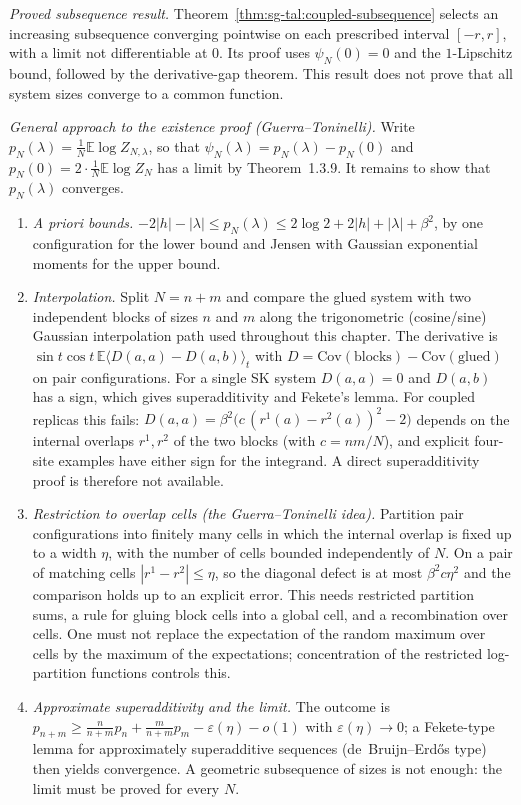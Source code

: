 \begin{remark}
\emph{Proved subsequence result.} Theorem~\ref{thm:sg-tal:coupled-subsequence} selects an increasing subsequence converging pointwise on each prescribed interval $[-r,r]$, with a limit not differentiable at $0$. Its proof uses $\psi_N(0)=0$ and the $1$-Lipschitz bound, followed by the derivative-gap theorem. This result does not prove that all system sizes converge to a common function.

\emph{General approach to the existence proof (Guerra--Toninelli).} Write $p_N(\lambda)=\frac1N\mathbb E\log Z_{N,\lambda}$, so that $\psi_N(\lambda)=p_N(\lambda)-p_N(0)$ and $p_N(0)=2\cdot\frac1N\mathbb E\log Z_N$ has a limit by Theorem~1.3.9. It remains to show that $p_N(\lambda)$ converges.
\begin{enumerate}
\item \emph{A priori bounds.} $-2|h|-|\lambda|\le p_N(\lambda)\le 2\log2+2|h|+|\lambda|+\beta^2$, by one configuration for the lower bound and Jensen with Gaussian exponential moments for the upper bound.
\item \emph{Interpolation.} Split $N=n+m$ and compare the glued system with two independent blocks of sizes $n$ and $m$ along the trigonometric (cosine/sine) Gaussian interpolation path used throughout this chapter. The derivative is $\sin t\cos t\,\mathbb E\langle D(a,a)-D(a,b)\rangle_t$ with $D=\mathrm{Cov}(\text{blocks})-\mathrm{Cov}(\text{glued})$ on pair configurations. For a single SK system $D(a,a)=0$ and $D(a,b)$ has a sign, which gives superadditivity and Fekete's lemma. For coupled replicas this fails: $D(a,a)=\beta^2\bigl(c\,(r^1(a)-r^2(a))^2-2\bigr)$ depends on the internal overlaps $r^1,r^2$ of the two blocks (with $c=nm/N$), and explicit four-site examples have either sign for the integrand. A direct superadditivity proof is therefore not available.
\item \emph{Restriction to overlap cells (the Guerra--Toninelli idea).} Partition pair configurations into finitely many cells in which the internal overlap is fixed up to a width $\eta$, with the number of cells bounded independently of $N$. On a pair of matching cells $|r^1-r^2|\le\eta$, so the diagonal defect is at most $\beta^2c\eta^2$ and the comparison holds up to an explicit error. This needs restricted partition sums, a rule for gluing block cells into a global cell, and a recombination over cells. One must not replace the expectation of the random maximum over cells by the maximum of the expectations; concentration of the restricted log-partition functions controls this.
\item \emph{Approximate superadditivity and the limit.} The outcome is $p_{n+m}\ge\frac{n}{n+m}p_n+\frac{m}{n+m}p_m-\varepsilon(\eta)-o(1)$ with $\varepsilon(\eta)\to0$; a Fekete-type lemma for approximately superadditive sequences (de~Bruijn--Erd\H{o}s type) then yields convergence. A geometric subsequence of sizes is not enough: the limit must be proved for every $N$.

\end{enumerate}
\end{remark}
